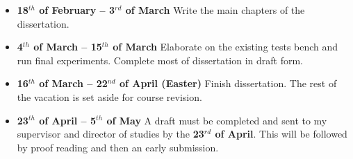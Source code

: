 \begin{itemize}
\item \textbf{18$^{th}$ of February -- 3$^{rd}$ of March} Write the main 
chapters of the dissertation.

\item \textbf{4$^{th}$ of March -- 15$^{th}$ of March} Elaborate on the 
existing tests bench and run final experiments.  Complete most of dissertation 
in draft form.

\item \textbf{16$^{th}$ of March -- 22$^{nd}$ of April (Easter)} Finish 
dissertation. The rest of the vacation is set aside for course revision.

\item \textbf{23$^{th}$ of April -- 5$^{th}$ of May} A draft must be completed 
and sent to my supervisor and director of studies by the \textbf{23$^{rd}$ of 
April}.  This will be followed by proof reading and then an early submission. 

\end{itemize}


